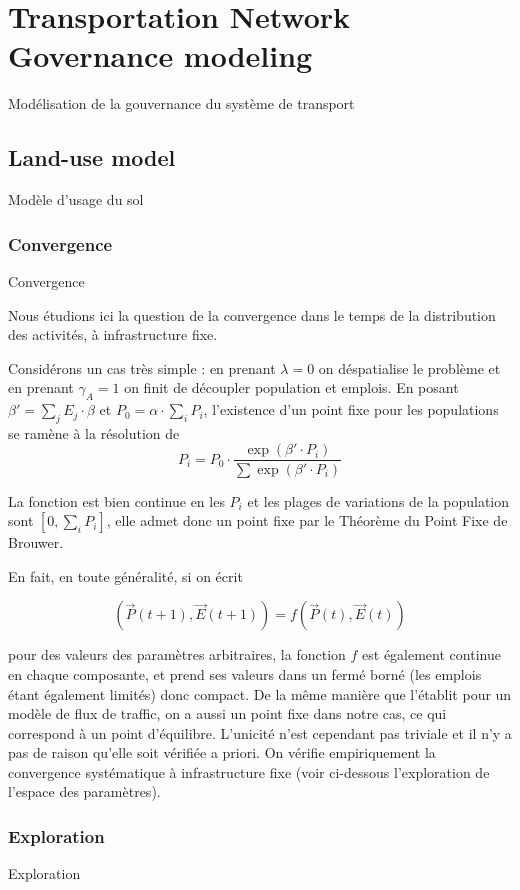 \section{Transportation Network Governance modeling}{Modélisation de la gouvernance du système de transport}

\label{app:sec:lutecia}


\subsection{Land-use model}{Modèle d'usage du sol}


\subsubsection{Convergence}{Convergence}

Nous étudions ici la question de la convergence dans le temps de la distribution des activités, à infrastructure fixe.

Considérons un cas très simple : en prenant $\lambda = 0$ on déspatialise le problème et en prenant $\gamma_A = 1$ on finit de découpler population et emplois. En posant $\beta' = \sum_j E_j \cdot \beta$ et $P_0 = \alpha \cdot \sum_i P_i$, l'existence d'un point fixe pour les populations se ramène à la résolution de
\[
P_i = P_0 \cdot \frac{\exp\left(\beta' \cdot P_i\right)}{\sum \exp\left(\beta' \cdot P_i\right)}
\]

La fonction est bien continue en les $P_i$ et les plages de variations de la population sont $[0,\sum_i P_i]$, elle admet donc un point fixe par le Théorème du Point Fixe de Brouwer. 

En fait, en toute généralité, si on écrit

\[
(\vec{P}(t+1),\vec{E}(t+1)) = f(\vec{P}(t),\vec{E}(t))
\]

pour des valeurs des paramètres arbitraires, la fonction $f$ est également continue en chaque composante, et prend ses valeurs dans un fermé borné (les emplois étant également limités) donc compact. De la même manière que \cite{leurent2014user} l'établit pour un modèle de flux de traffic, on a aussi un point fixe dans notre cas, ce qui correspond à un point d'équilibre. L'unicité n'est cependant pas triviale et il n'y a pas de raison qu'elle soit vérifiée a priori. On vérifie empiriquement la convergence systématique à infrastructure fixe (voir ci-dessous l'exploration de l'espace des paramètres).


\subsubsection{Exploration}{Exploration}


